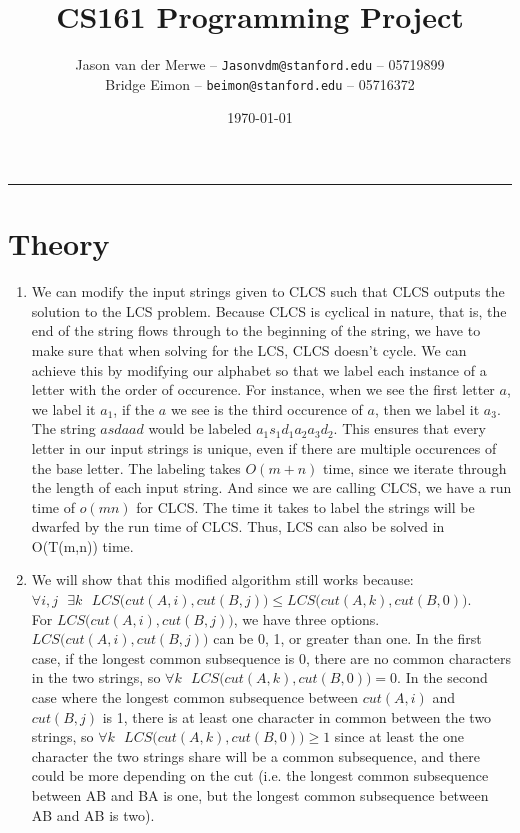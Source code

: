 \documentclass[12pt]{article}
\title{CS161 Programming Project}
\author{Jason van der Merwe -- \texttt{Jasonvdm@stanford.edu} -- 05719899\\
Bridge Eimon -- \texttt{beimon@stanford.edu} -- 05716372}
\date{\today}
\begin{document}
\maketitle

\vspace{-0.3in}
\rule{\linewidth}{0.4pt}


\section*{Theory}
\begin{enumerate}[label=(\alph*)]
    \item We can modify the input strings given to CLCS such that CLCS outputs the solution to the LCS problem. Because CLCS is cyclical in nature, that is, the end of the string flows through to the beginning of the string, we have to make sure that when solving for the LCS, CLCS doesn't cycle. We can achieve this by modifying our alphabet so that we label each instance of a letter with the order of occurence. For instance, when we see the first letter $a$, we label it $a_1$, if the $a$ we see is the third occurence of $a$, then we label it $a_3$. The string $asdaad$ would be labeled $a_1s_1d_1a_2a_3d_2$. This ensures that every letter in our input strings is unique, even if there are multiple occurences of the base letter. The labeling takes $O(m+n)$ time, since we iterate through the length of each input string. And since we are calling CLCS, we have a run time of $o(mn)$ for CLCS. The time it takes to label the strings will be dwarfed by the run time of CLCS. Thus, LCS can also be solved in O(T(m,n)) time.\\ 
    \item We will show that this modified algorithm still works because:\\
     $\forall i,j \text{ } \exists k \text{ } LCS\big(cut(A,i), cut(B,j)\big) \le LCS\big(cut(A,k), cut(B,0)\big)$.\\
    For $LCS\big(cut(A,i), cut(B,j)\big)$, we have three options. $LCS\big(cut(A,i), cut(B,j)\big)$ can be 0, 1, or greater than one. In the first case, if the longest common subsequence is 0, there are no common characters in the two strings, so $\forall k \text{ } LCS\big(cut(A,k), cut(B,0)\big) = 0$. In the second case where the longest common subsequence between $cut(A,i)$ and $cut(B,j)$ is 1, there is at least one character in common between the two strings, so $\forall k \text{ } LCS\big(cut(A,k), cut(B,0)\big) \ge 1$ since at least the one character the two strings share will be a common subsequence, and there could be more depending on the cut (i.e. the longest common subsequence between AB and BA is one, but the longest common subsequence between AB and AB is two).\\

\end{enumerate}
\end{document}
